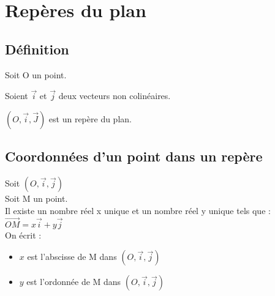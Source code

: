 \ifdefined\COMPLETE
\else
    
    
\fi


\section{Repères du plan}

\subsection{Définition}

Soit O un point.

Soient $\vec{i}$ et $\vec{j}$ deux vecteurs non colinéaires.


$\left(O, \vec{i}, \vec{J}\right)$ est un repère du plan.

\subsection{Coordonnées d'un point dans un repère}

Soit $\left(O, \vec{i}, \vec{j}\right)$\\

Soit M un point. \\

Il existe un nombre réel x unique et un nombre réel y unique tels que : \\

$ \overrightarrow{OM} = x\vec{i} + y\vec{j} $ \\

On écrit :

\begin{itemize}
\item $x$ est l'abscisse de M dans $\left(O, \vec{i}, \vec{j}\right)$\\
\item $y$ est l'ordonnée de M dans $\left(O,\vec{i}, \vec{j}\right)$\\
\end{itemize}

